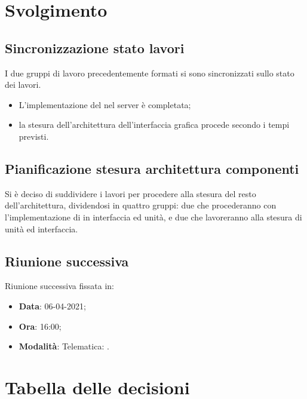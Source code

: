 \documentclass[]{article}
\begin{document}
	\newpage

	\section{Svolgimento}
		\subsection{Sincronizzazione stato lavori}
		I due gruppi di lavoro precedentemente formati si sono sincronizzati sullo stato dei lavori.
		\begin{itemize}
			\item L'implementazione del  nel server è completata;
			\item la stesura dell'architettura dell'interfaccia grafica procede secondo i tempi previsti.
		\end{itemize}

		\subsection{Pianificazione stesura architettura componenti}
		Si è deciso di suddividere i lavori per procedere alla stesura del resto dell'architettura, dividendosi in quattro gruppi: due che procederanno con l'implementazione di  in interfaccia ed unità, e due che lavoreranno alla stesura di unità ed interfaccia.
		\\

	\subsection{Riunione successiva}
	Riunione successiva fissata in:
	\begin{itemize}
		\item \textbf{Data}: 06-04-2021;
		\item \textbf{Ora}: 16:00;
		\item \textbf{Modalità}: Telematica: .
	\end{itemize}
	

	\newpage

	\section{Tabella delle decisioni}
\end{document}
